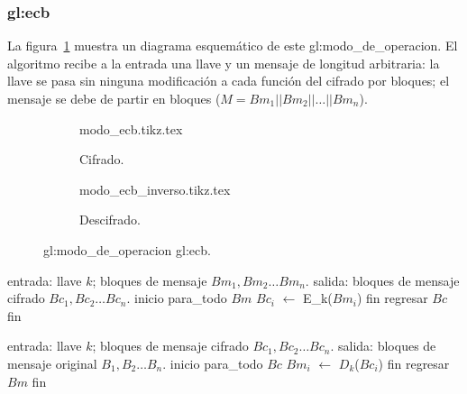 %
%

\subsubsection{\texorpdfstring{\acrfull{gl:ecb}}{Electronic Codebook (ECB)}}

La figura~\ref{figura:ecb} muestra un diagrama esquemático de este
\gls{gl:modo_de_operacion}. El algoritmo recibe a la entrada una llave y un
mensaje de longitud arbitraria: la llave se pasa sin ninguna modificación a
cada función del cifrado por bloques; el mensaje se debe de partir en bloques
($ M = Bm_1 || Bm_2 || \dots || Bm_n $).

\begin{figure}
  \centering
  \begin{subfigure}{0.45\textwidth}
    \begin{center}
      {modo_ecb.tikz.tex}
      \caption{Cifrado.}
    \end{center}
  \end{subfigure}
  \begin{subfigure}{0.45\textwidth}
    \begin{center}
      {modo_ecb_inverso.tikz.tex}
      \caption{Descifrado.}
    \end{center}
  \end{subfigure}
  \caption{\Gls{gl:modo_de_operacion} \acrshort{gl:ecb}.}
  \label{figura:ecb}
\end{figure}

\begin{pseudocodigo}[%
    caption={\Gls{gl:modo_de_operacion} \acrshort{gl:ecb}, cifrado.}%
  ]
    entrada: llave $ k $; bloques de mensaje $ Bm_1, Bm_2 \dots Bm_n $.
    salida:  bloques de mensaje cifrado $ Bc_1, Bc_2 \dots Bc_n $.
    inicio
      para_todo $Bm$
        $Bc_i$ $\gets$ E_k($Bm_i$)
      fin
      regresar $Bc$
    fin
\end{pseudocodigo}

\begin{pseudocodigo}[%
    caption={\Gls{gl:modo_de_operacion} \acrshort{gl:ecb}, descifrado.}%
  ]
    entrada: llave $ k $; bloques de mensaje cifrado $ Bc_1, Bc_2 \dots Bc_n $.
    salida:  bloques de mensaje original $ B_1, B_2 \dots B_n $.
    inicio
      para_todo $Bc$
        $Bm_i$ $\gets$ $D_k$($Bc_i$)
      fin
      regresar $Bm$
    fin
\end{pseudocodigo}
